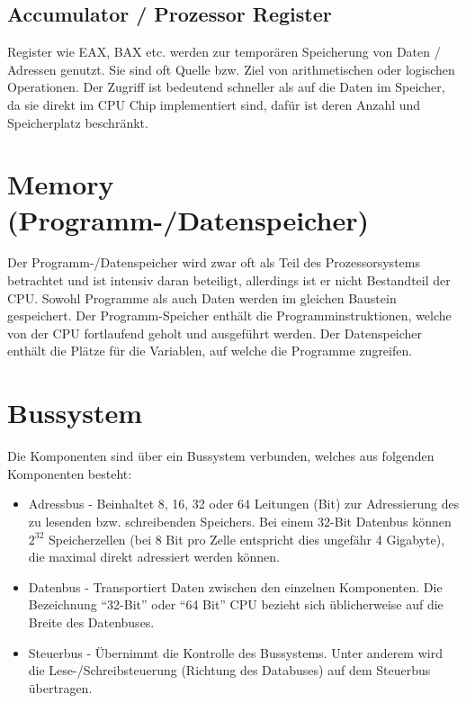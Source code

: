 \documentclass[a4paper,10pt]{report}
\begin{document}
\subsection{Accumulator / Prozessor Register}
Register wie EAX, BAX etc. werden zur temporären Speicherung von Daten / Adressen genutzt. Sie sind oft Quelle bzw. Ziel von arithmetischen oder logischen Operationen. Der Zugriff ist bedeutend schneller als auf die Daten im Speicher, da sie direkt im CPU Chip implementiert sind, dafür ist deren Anzahl und Speicherplatz beschränkt.
\section{Memory (Programm-/Datenspeicher)}
Der Programm-/Datenspeicher wird zwar oft als Teil des Prozessorsystems betrachtet und ist intensiv daran beteiligt, allerdings ist er nicht Bestandteil der CPU. Sowohl Programme als auch Daten werden im gleichen Baustein gespeichert. Der Programm-Speicher enthält die Programminstruktionen, welche von der CPU fortlaufend geholt und ausgeführt werden. Der Datenspeicher enthält die Plätze für die Variablen, auf welche die Programme zugreifen.
\section{Bussystem}
Die Komponenten sind über ein Bussystem verbunden, welches aus folgenden Komponenten besteht:
\begin{itemize}	
	\item Adressbus - Beinhaltet 8, 16, 32 oder 64 Leitungen (Bit) zur Adressierung des zu lesenden bzw. schreibenden Speichers. Bei einem 32-Bit Datenbus können $2^32$ Speicherzellen (bei 8 Bit pro Zelle entspricht dies ungefähr 4 Gigabyte), die maximal direkt adressiert werden können.
	\item Datenbus - Transportiert Daten zwischen den einzelnen Komponenten. Die Bezeichnung "`32-Bit"' oder "`64 Bit"' CPU bezieht sich üblicherweise auf die Breite des Datenbuses. 	 
	\item Steuerbus - Übernimmt die Kontrolle des Bussystems. Unter anderem wird die Lese-/Schreibsteuerung (Richtung des Databuses) auf dem Steuerbus übertragen.
\end{itemize}
\end{document}
